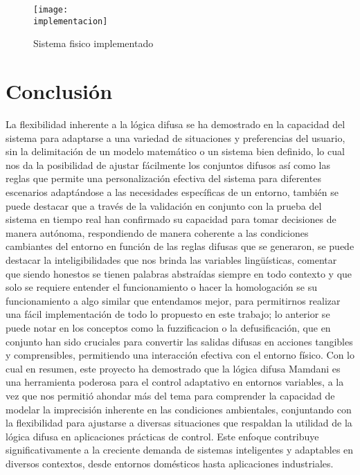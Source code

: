 \documentclass[a4paper, 12pt]{article}
\newcommand{\control}{img/control.jpg}
\newcommand{\implementacion}{img/sistemaFisico.jpg}
\begin{document}
	\begin{figure}[!h]
		\centering
		\texttt{[image: \\implementacion]}
		\caption{Sistema fisico implementado}
        \label{fig:fisico}
	\end{figure}

    \section{Conclusión}
    La flexibilidad inherente a la lógica difusa se ha demostrado en la capacidad del sistema para adaptarse a una variedad de situaciones y preferencias del usuario, sin la delimitación de un modelo matemático o un sistema bien definido, lo cual nos da  la posibilidad de ajustar fácilmente los conjuntos difusos así como las reglas que permite una personalización efectiva del sistema para diferentes escenarios adaptándose a las necesidades específicas de un entorno, también se puede destacar que a través de la validación en conjunto con la prueba del sistema en tiempo real han confirmado su capacidad para tomar decisiones de manera autónoma, respondiendo de manera coherente a las condiciones cambiantes del entorno en función de las reglas difusas que se generaron, se puede destacar la inteligibilidades que nos brinda las variables lingüísticas, comentar que siendo honestos se tienen palabras abstraídas siempre en todo contexto y que solo se requiere entender el funcionamiento o hacer la homologación se su funcionamiento a algo similar que entendamos mejor, para permitirnos realizar una fácil implementación de todo lo propuesto en este trabajo; lo anterior se puede notar en los conceptos como la fuzzificacion o la defusificación, que en conjunto han sido cruciales para convertir las salidas difusas en acciones tangibles y comprensibles, permitiendo una interacción efectiva con el entorno físico. Con lo cual en resumen, este proyecto ha demostrado que la lógica difusa Mamdani es una herramienta poderosa para el control adaptativo en entornos variables, a la vez que nos permitió ahondar más del tema para comprender la capacidad de modelar la imprecisión inherente en las condiciones ambientales, conjuntando con la flexibilidad para ajustarse a diversas situaciones que respaldan la utilidad de la lógica difusa en aplicaciones prácticas de control. Este enfoque contribuye significativamente a la creciente demanda de sistemas inteligentes y adaptables en diversos contextos, desde entornos domésticos hasta aplicaciones industriales.
 

    
\end{document}
